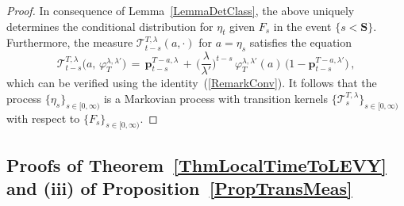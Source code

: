 \documentclass[10pt]{article}
\numberwithin{equation}{section}
\theoremstyle{definition}
\begin{document}
\begin{proof}
In consequence of Lemma~\ref{LemmaDetClass}, the above uniquely determines the  conditional distribution for $\eta_t$ given $F_s $ in the event $\{s<\mathbf{S} \}$.  Furthermore,  the measure $\mathscr{T}^{T,\lambda}_{t-s}(a, \cdot)$ for $a=\eta_s$ satisfies the equation
$$ 
\mathscr{T}^{T,\lambda}_{t-s}\Big(a,\, \varphi_T^{\lambda,\lambda'}\Big)\,=\, \mathbf{p}_{t-s}^{T-a,\lambda  } \,+\,\Big(\frac{\lambda}{\lambda'}\Big)^{t-s} \, \varphi_T^{\lambda,\lambda'}(a)\,\Big(1-\mathbf{p}_{t-s}^{T-a,\lambda'  }  \Big) \nonumber  \,,
$$
which can be verified using the identity~(\ref{RemarkConv}).  It follows that the process $\{ \eta_s \}_{s\in [0,\infty)}$ is a  Markovian process with transition kernels $\{\mathscr{T}^{T,\lambda}_{s}\}_{ s\in [0,\infty)  }$ with respect to $\{  F_s\}_{s\in [0,\infty)}$. 
\end{proof}




\subsection{Proofs of Theorem~\ref{ThmLocalTimeToLEVY} and (iii) of Proposition~\ref{PropTransMeas}}\label{SubsecInvProc}
\end{document}
